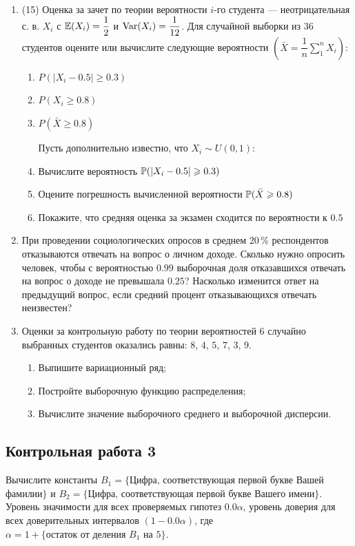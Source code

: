 \documentclass[12pt, a4paper]{article}\usepackage[]{graphicx}\usepackage[]{color}
\begin{document}
\begin{enumerate}
\item (15) Оценка за зачет по теории вероятности $i$-го студента — неотрицательная с. в. $X_i$ с $\E(X_i)=\dfrac{1}{2}$ и $\Var(X_i)=\dfrac{1}{12}$. Для случайной выборки из $36$ студентов оцените или вычислите следующие вероятности $\left(\bar{X} = \dfrac{1}{n} \sum \limits_1^n X_i \right)$:
\begin{enumerate}
\item $P(|X_i-0.5|\geqslant 0.3)$
\item $P(X_i\geqslant 0.8)$
\item $P(\bar{X}\geqslant 0.8)$

Пусть дополнительно известно, что $X_i \sim U(0,1)$:
\item Вычислите вероятность $\P(|X_i-0.5|\geqslant 0.3)$
\item Оцените погрешность вычисленной вероятности $\P(\bar{X}\geqslant 0.8)$
\item Покажите, что средняя оценка за экзамен сходится по вероятности к $0.5$

\end{enumerate}

\item При проведении социологических опросов в среднем $20\,\%$ респондентов отказываются отвечать на вопрос о личном доходе. Сколько нужно опросить человек, чтобы с вероятностью $0.99$ выборочная доля отказавшихся отвечать на вопрос о доходе не превышала $0.25$? Насколько изменится ответ на предыдущий вопрос, если средний процент отказывающихся отвечать неизвестен?

\item Оценки за контрольную работу по теории вероятностей $6$ случайно выбранных студентов оказались равны: $8$, $4$, $5$, $7$, $3$, $9$.
\begin{enumerate}
\item Выпишите вариационный ряд;
\item Постройте выборочную функцию распределения;
\item Вычислите значение выборочного среднего и выборочной дисперсии.
\end{enumerate}

\end{enumerate}


\subsection{Контрольная работа 3}

Вычислите константы $B_1=\{\text{Цифра, соответствующая первой букве}$
Вашей\\ фамилии$\}$ и $B_2=\{\text{Цифра, соответствующая первой букве}$
 Вашего имени$\}$.\\
Уровень значимости для всех проверяемых гипотез $0.0\alpha$, уровень доверия для всех доверительных интервалов $(1-0.0\alpha)$, где  $\alpha =1+ \{\text{остаток от деления } B_1 \text{ на }  5\}$.\\
\end{document}
